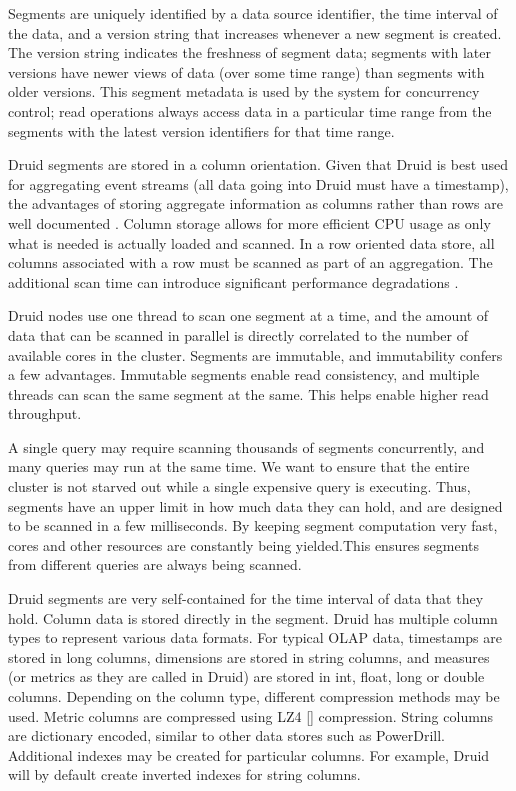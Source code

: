 \documentclass{vldb}
\begin{document}
Segments are uniquely identified by a data source identifier, the time interval
of the data, and a version string that increases whenever a new segment is
created. The version string indicates the freshness of segment data; segments
with later versions have newer views of data (over some time range) than
segments with older versions. This segment metadata is used by the system for
concurrency control; read operations always access data in a particular time
range from the segments with the latest version identifiers for that time
range.

Druid segments are stored in a column orientation. Given that Druid is best
used for aggregating event streams (all data going into Druid must have a
timestamp), the advantages of storing aggregate information as columns rather
than rows are well documented \cite{abadi2008column}. Column storage allows for
more efficient CPU usage as only what is needed is actually loaded and scanned.
In a row oriented data store, all columns associated with a row must be scanned
as part of an aggregation. The additional scan time can introduce significant
performance degradations \cite{abadi2008column}.

Druid nodes use one thread to scan one segment at a time, and the amount of
data that can be scanned in parallel is directly correlated to the number of
available cores in the cluster. Segments are immutable, and immutability
confers a few advantages. Immutable segments enable read consistency, and
multiple threads can scan the same segment at the same. This helps enable
higher read throughput. 

A single query may require scanning thousands of segments concurrently, and
many queries may run at the same time. We want to ensure that the entire
cluster is not starved out while a single expensive query is executing. Thus,
segments have an upper limit in how much data they can hold, and are designed
to be scanned in a few milliseconds. By keeping segment computation very fast,
cores and other resources are constantly being yielded.This ensures segments
from different queries are always being scanned.

Druid segments are very self-contained for the time interval of data that they
hold. Column data is stored directly in the segment. Druid has multiple column
types to represent various data formats. For typical OLAP data, timestamps are
stored in long columns, dimensions are stored in string columns, and measures
(or metrics as they are called in Druid) are stored in int, float, long or
double columns. Depending on the column type, different compression methods may
be used. Metric columns are compressed using LZ4 [] compression. String columns
are dictionary encoded, similar to other data stores such as PowerDrill\cite{hall2012processing}.
Additional indexes may be created for particular columns. For example, Druid
will by default create inverted indexes for string columns.
\end{document}
